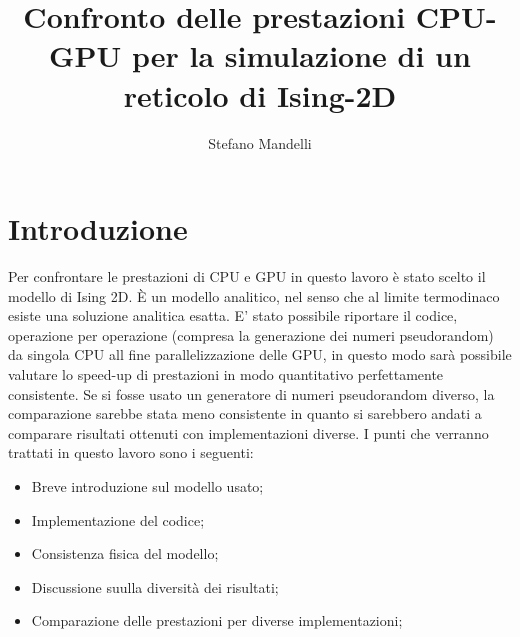 \documentclass[a4paper,12pt]{article}
\begin{document}
\author{Stefano Mandelli}
\title{\bf \Huge Confronto delle prestazioni CPU-GPU per la simulazione di un reticolo di Ising-2D}
\date{}
\maketitle
\section*{Introduzione}
Per confrontare le prestazioni di CPU e GPU in questo lavoro è stato scelto il modello di Ising 2D. \`E un modello analitico, nel senso che al limite termodinaco esiste una soluzione analitica esatta. E' stato possibile riportare il codice, operazione per operazione (compresa la generazione dei numeri pseudorandom) da singola CPU all fine parallelizzazione delle GPU, in questo modo sarà possibile valutare lo speed-up di prestazioni in modo quantitativo perfettamente consistente. Se si fosse usato un generatore di numeri pseudorandom diverso, la comparazione sarebbe stata meno consistente in quanto si sarebbero andati a comparare risultati ottenuti con implementazioni diverse. I punti che verranno trattati in questo lavoro sono i seguenti:
\begin{itemize}
	\item Breve introduzione sul modello usato;
	\item Implementazione del codice;
	\item Consistenza fisica del modello;
	\item Discussione suulla diversità dei risultati;
	\item Comparazione delle prestazioni per diverse implementazioni;
\end{itemize}
\end{document}
